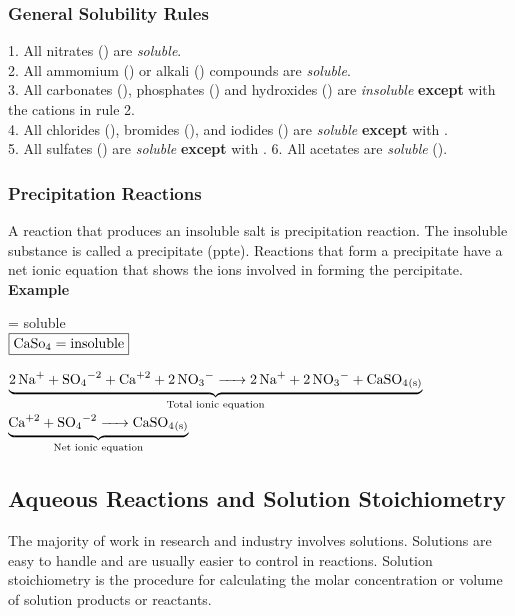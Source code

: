 \documentclass[11pt]{article}
\begin{document}
    \subsubsection{General Solubility Rules}
    1. All nitrates () are \emph{soluble}. \\
    2. All ammomium () or alkali () compounds are \emph{soluble}. \\
    3. All carbonates (), phosphates () and hydroxides () are \emph{insoluble} \textbf{except} with the cations in rule 2. \\
    4. All chlorides (), bromides (), and iodides () are \emph{soluble} \textbf{except} with . \\
    5. All sulfates () are \emph{soluble} \textbf{except} with .
    6. All acetates are \emph{soluble} ().

    \subsubsection{Precipitation Reactions}
    A reaction that produces an insoluble salt is precipitation reaction. The insoluble substance is called a precipitate (ppte). Reactions that form a precipitate have a net ionic equation that shows the ions involved in forming the percipitate. \\

    \textbf{Example} 
    \begin{center}
         = soluble \\
        $\boxed{\ce{CaSo4} = \text{insoluble}}$
    \end{center}

    \begin{center}
        $\underbrace{\ce{2 Na^{+} + SO4^{-2} + Ca^{+2} + 2 NO3^{-} -> 2 Na^{+} + 2 NO3^{-} + CaSO4_{(s)}}}_\text{Total ionic equation}$
        $\underbrace{\ce{Ca^{+2} + SO4^{-2} -> CaSO4_{(s)}}}_\text{Net ionic equation}$
    \end{center}

    \subsection{Aqueous Reactions and Solution Stoichiometry}
    The majority of work in research and industry involves solutions. Solutions are easy to handle and are usually easier to control in reactions. Solution stoichiometry is the procedure for calculating the molar concentration or volume of solution products or reactants.
\end{document}
